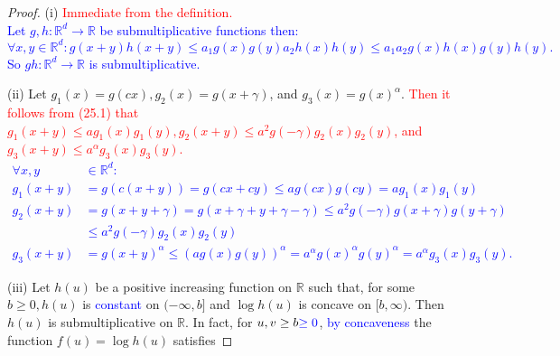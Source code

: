 \documentclass[a4paper,11pt]{article}
\begin{document}
\begin{proof}

    (i) \textcolor{red}{Immediate from the definition. \\}
    \textcolor{blue}{
    Let $g,h:\mathbb{R}^{d}\rightarrow \mathbb{R}$ be submultiplicative functions then:
    $$
        \forall x,y \in \mathbb{R}^{d}: g(x+y)h(x+y) \le a_{1} g(x)g(y) a_{2} h(x)h(y) \leq a_{1}a_{2} g(x)h(x)g(y)h(y).
    $$
    So $gh:\mathbb{R}^{d}\rightarrow \mathbb{R}$ is submultiplicative.\\
    }

    (ii)
    Let $g_{1}(x)=g(c x), g_{2}(x)=g(x+\gamma)$, and $g_{3}(x)=g(x)^{\alpha}$.
    \textcolor{red}{Then it follows from (25.1) that $g_{1}(x+y) \leq a g_{1}(x) g_{1}(y), g_{2}(x+y) \leq
            a^{2} g(-\gamma) g_{2}(x) g_{2}(y)$, and $g_{3}(x+y) \leq a^{\alpha} g_{3}(x) g_{3}(y)$. }
    \textcolor{blue}{
        \begin{align*}
            \forall x,y & \in \mathbb{R}^{d}:                                                                                                                 \\
            g_{1}(x+y)  & = g(c(x+y)) = g(c x + c y) \leq a g(c x) g(c y) = a g_{1}(x) g_{1}(y)                                                               \\
            g_{2}(x+y)  & = g(x + y + \gamma) = g(x + \gamma + y + \gamma - \gamma)
            \le a^{2} g(-\gamma) g(x+\gamma) g(y + \gamma)                                                                                                    \\
                        & \le a^{2} g(-\gamma) g_{2}( x)g_{2}(y)                                                                                              \\
            g_{3}(x+y)  & = g(x+y) ^{\alpha} \le \left(a g(x) g(y) \right) ^{\alpha}= a^{\alpha} g(x)^{\alpha} g(y)^{\alpha} = a^{\alpha} g_{3}(x) g_{3}(y) .
        \end{align*}
    }

    (iii)
    Let $h(u)$ be a positive increasing function on $\mathbb{R}$ such that, for some
    $b \geq 0, h(u)$ is \textcolor{blue}{constant} on $(-\infty, b]$ and $\log h(u)$ is concave on $[b, \infty)$. Then
    $h(u)$ is submultiplicative on $\mathbb{R}$. In fact, for $u, v \geq b \textcolor{blue}{ \ge 0}$,
    \textcolor{blue}{by concaveness} the function $f(u)=\log h(u)$ satisfies


\end{proof}
\end{document}
